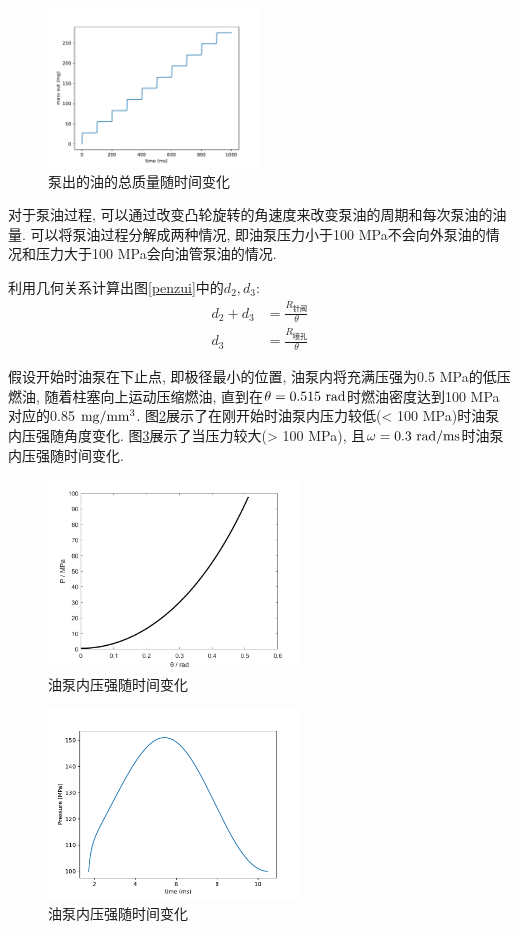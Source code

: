 \documentclass{cumcmthesis}
\newcommand{\f}[2]{\frac{#1}{#2}}
\newcommand{\ar}[1]{
        \begin{aligned}                              %
            #1
        \end{aligned}   }
\newcommand{\x}{&=}
\begin{document}
\begin{figure}[htbp]
    \centering
    \includegraphics[width=0.5\textwidth]{bout2.pdf} 
    \caption{泵出的油的总质量随时间变化}
    \label{bout2}
\end{figure}

对于泵油过程, 可以通过改变凸轮旋转的角速度来改变泵油的周期和每次泵油的油量. 可以将泵油过程分解成两种情况, 即油泵压力小于100 MPa不会向外泵油的情况和压力大于100 MPa会向油管泵油的情况. 

利用几何关系计算出图\ref{penzui}中的$d_2,d_3$:
$$\ar{
    d_2 +d_3 \x \f{R_{\text{针阀}}}{\theta}\\
    d_3 \x \f{R_{\text{喷孔}}}{\theta}
}$$ 

假设开始时油泵在下止点, 即极径最小的位置, 油泵内将充满压强为0.5 MPa的低压燃油, 随着柱塞向上运动压缩燃油, 直到在$\theta = 0.515\ \rm{rad}$时燃油密度达到100 MPa对应的0.85 $\rm mg/mm^3$. 图\ref{bin1}展示了在刚开始时油泵内压力较低(< 100 MPa)时油泵内压强随角度变化. 图\ref{bin}展示了当压力较大(> 100 MPa), 且$\omega =0.3\ \rm{rad/ms}$时油泵内压强随时间变化. 

\begin{figure}[htbp]
    \centering
    \includegraphics[width=0.6\textwidth]{THETA_P.png} 
    \caption{油泵内压强随时间变化}
    \label{bin1}
\end{figure}

\begin{figure}[htbp]
    \centering
    \includegraphics[width=0.6\textwidth]{bin_omega_0_3.pdf} 
    \caption{油泵内压强随时间变化}
    \label{bin}
\end{figure}
\end{document}
